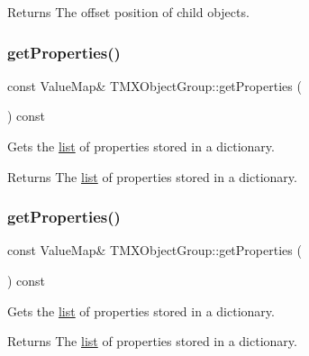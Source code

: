 \begin{DoxyReturn}{Returns}
The offset position of child objects. 
\end{DoxyReturn}
\mbox{\label{classTMXObjectGroup_a182c7a7b7ed113bf2c974fcfff818d28}} 
\subsubsection{\texorpdfstring{get\+Properties()}{getProperties()}\hspace{0.1cm}{\footnotesize\ttfamily [1/2]}}
{\footnotesize\ttfamily const Value\+Map\& T\+M\+X\+Object\+Group\+::get\+Properties (\begin{DoxyParamCaption}{ }\end{DoxyParamCaption}) const\hspace{0.3cm}{\ttfamily [inline]}}

Gets the \hyperlink{protocollist-p}{list} of properties stored in a dictionary.

\begin{DoxyReturn}{Returns}
The \hyperlink{protocollist-p}{list} of properties stored in a dictionary. 
\end{DoxyReturn}
\mbox{\label{classTMXObjectGroup_a182c7a7b7ed113bf2c974fcfff818d28}} 
\subsubsection{\texorpdfstring{get\+Properties()}{getProperties()}\hspace{0.1cm}{\footnotesize\ttfamily [2/2]}}
{\footnotesize\ttfamily const Value\+Map\& T\+M\+X\+Object\+Group\+::get\+Properties (\begin{DoxyParamCaption}{ }\end{DoxyParamCaption}) const\hspace{0.3cm}{\ttfamily [inline]}}

Gets the \hyperlink{protocollist-p}{list} of properties stored in a dictionary.

\begin{DoxyReturn}{Returns}
The \hyperlink{protocollist-p}{list} of properties stored in a dictionary. 
\end{DoxyReturn}
\mbox{\label{classTMXObjectGroup_a8cf30e4dc195b522f044efa6af6b2690}} 
